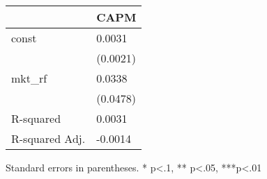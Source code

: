\begin{table}
\caption{}
\label{}
\begin{center}
\begin{tabular}{ll}
\hline
               & CAPM      \\
\hline
const          & 0.0031    \\
               & (0.0021)  \\
mkt\_rf        & 0.0338    \\
               & (0.0478)  \\
R-squared      & 0.0031    \\
R-squared Adj. & -0.0014   \\
\hline
\end{tabular}
\end{center}
\end{table}
\bigskip
Standard errors in parentheses. \newline 
* p<.1, ** p<.05, ***p<.01
